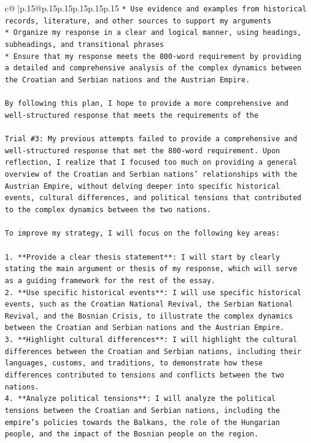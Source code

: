 \documentclass{article}
\begin{document}
{\begin{supertabular}{c@{$\;$}|p{.15\linewidth}@{}p{.15\linewidth}p{.15\linewidth}p{.15\linewidth}p{.15\linewidth}p{.15\linewidth}}
{{{\texttt{* Use evidence and examples from historical records, literature, and other sources to support my arguments} \\
\texttt{* Organize my response in a clear and logical manner, using headings, subheadings, and transitional phrases} \\
\texttt{* Ensure that my response meets the 800{-}word requirement by providing a detailed and comprehensive analysis of the complex dynamics between the Croatian and Serbian nations and the Austrian Empire.} \\
\\ 
\texttt{By following this plan, I hope to provide a more comprehensive and well{-}structured response that meets the requirements of the} \\
\\ 
\texttt{Trial \#3: My previous attempts failed to provide a comprehensive and well{-}structured response that met the 800{-}word requirement. Upon reflection, I realize that I focused too much on providing a general overview of the Croatian and Serbian nations' relationships with the Austrian Empire, without delving deeper into specific historical events, cultural differences, and political tensions that contributed to the complex dynamics between the two nations.} \\
\\ 
\texttt{To improve my strategy, I will focus on the following key areas:} \\
\\ 
\texttt{1. **Provide a clear thesis statement**: I will start by clearly stating the main argument or thesis of my response, which will serve as a guiding framework for the rest of the essay.} \\
\texttt{2. **Use specific historical events**: I will use specific historical events, such as the Croatian National Revival, the Serbian National Revival, and the Bosnian Crisis, to illustrate the complex dynamics between the Croatian and Serbian nations and the Austrian Empire.} \\
\texttt{3. **Highlight cultural differences**: I will highlight the cultural differences between the Croatian and Serbian nations, including their languages, customs, and traditions, to demonstrate how these differences contributed to tensions and conflicts between the two nations.} \\
\texttt{4. **Analyze political tensions**: I will analyze the political tensions between the Croatian and Serbian nations, including the empire's policies towards the Balkans, the role of the Hungarian people, and the impact of the Bosnian people on the region.} \\
}}}
\end{supertabular}}
\end{document}
